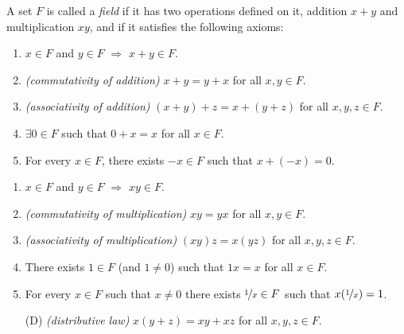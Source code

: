 \documentclass[10pt,aspectratio=169]{beamer}
\begin{document}
\begin{frame}

\begin{definition}
A set $F$ is called a \emph{field} if it has two operations
defined on it, addition $x+y$ and multiplication $xy$, and if it satisfies
the following axioms:
\pause
\begin{enumerate}[({A}1)]
\item
$x \in F$ and $y \in F$ $\Rightarrow$ $x+y \in F$.
\pause
\item
\emph{(commutativity of addition)}
$x+y = y+x$ for all $x,y \in F$.
\pause
\item
\emph{(associativity of addition)}
$(x+y)+z = x+(y+z)$ for all $x,y,z \in F$.
\pause
\item
$\exists 0 \in F$ such that
$0+x = x$ for all $x \in F$.
\pause
\item
For every $x\in F$, there exists $-x \in F$
such that $x + (-x) = 0$.
\end{enumerate}
\begin{enumerate}[({M}1)]
\pause
\item
$x \in F$ and $y \in F$ $\Rightarrow$ $xy \in F$.
\pause
\item
\emph{(commutativity of multiplication)}
$xy = yx$ for all $x,y \in F$.
\pause
\item
\emph{(associativity of multiplication)}
$(xy)z = x(yz)$ for all $x,y,z \in F$.
\pause
\item
There exists $1 \in F$ (and $1 \not= 0$) such that
$1x = x$ for all $x \in F$.
\pause
\item
For every $x\in F$ such that $x \not= 0$ there exists
$\nicefrac{1}{x} \in F$
such that $x(\nicefrac{1}{x}) = 1$.
\pause
\item[(D)]
\emph{(distributive law)} $x(y+z) = xy+xz$
for all $x,y,z \in F$.
\end{enumerate}
\end{definition}

\end{frame}
\end{document}
